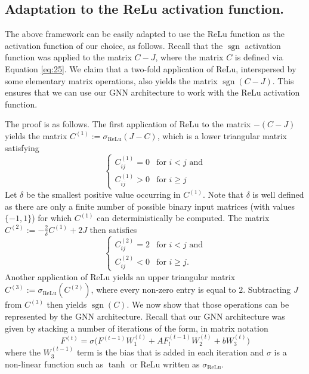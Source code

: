 \documentclass[letterpaper]{article}
\theoremstyle{definition}
\newcommand{\sgn}{\operatorname{sgn}}
\begin{document}
\subsection{Adaptation to the ReLu activation function.}
The above framework can be easily adapted to 
use the ReLu function as the activation function 
of our choice, as follows. Recall that the $\sgn$ activation function 
was applied to the matrix $C-J$,
where the matrix $C$ is defined via Equation \ref{eq:25}.  
We claim that a two-fold application of ReLu, interspersed 
by some elementary matrix operations, also yields the matrix $\sgn(C-J)$.
This ensures that we can use our GNN architecture to work with the ReLu activation function. 

The proof is as follows. 
The first application of ReLu to the matrix $-(C-J)$ yields the matrix $C^{(1)}:= \sigma_\text{ReLu}(J-C)$,
which is a lower triangular matrix satisfying
\begin{equation*}
	\begin{cases}
		C^{(1)}_{ij} = 0 & \text{for } i <j \text{ and} \\
		C^{(1)}_{ij} > 0 & \text{for }i \geq j          
	\end{cases}
\end{equation*}
Let $\delta$ be the smallest positive value occurring in $C^{(1)}$.
Note that $\delta$ is well defined as there are only a finite number of possible binary input matrices (with values $\{-1,1\}$) for which $C^{(1)}$ can deterministically be computed.
The matrix $C^{(2)} := -\frac{2}{\delta}C^{(1)} +2J$ then satisfies 
\begin{equation*}
	\begin{cases}
		C^{(2)}_{ij} = 2 & \text{for } i<j \text{ and} \\
		C^{(2)}_{ij} < 0 & \text{for } i \geq j.       
	\end{cases}
\end{equation*}
Another application of ReLu yields an upper triangular matrix $C^{(3)} := \sigma_\text{ReLu}(C^{(2)})$,
where every non-zero entry is equal to $2$. Subtracting $J$ from $C^{(3)}$ then yields $\sgn{}(C)$. We now show that those operations can be represented by the GNN architecture.
Recall that our GNN architecture was given by stacking a number of iterations of the form, in matrix notation
\begin{equation}\label{eq:matrixGNN}
	F^{(t)} = \sigma \Big( F^{(t-1)}W^{(t)}_1 + AF^{(t-1)}_l W^{(t)}_2 + bW^{(t)}_3 \Big)
\end{equation}
where the $W^{(t-1)}_3$ term is the bias that is added in each iteration and $\sigma$ is a non-linear function such as $\operatorname{tanh}$ or ReLu written as $\sigma_{\operatorname{ReLu}}$.
\end{document}
